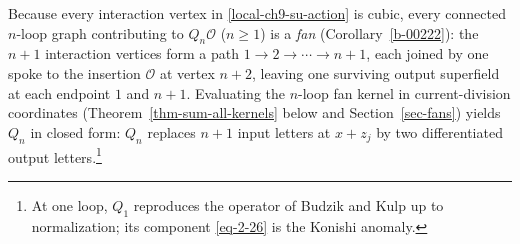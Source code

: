\documentclass[11pt]{article}
\numberwithin{equation}{section}
\numberwithin{figure}{section}
\numberwithin{table}{section}
\begin{document}
Because every interaction vertex in \eqref{local-ch9-su-action} is cubic, every connected $n$-loop graph contributing to $Q_n\mathcal O$ ($n\ge 1$) is a \emph{fan} (Corollary~\ref{b-00222}): the $n+1$ interaction vertices form a path $1\to 2\to\cdots\to n+1$, each joined by one spoke to the insertion $\mathcal O$ at vertex $n+2$, leaving one surviving output superfield at each endpoint $1$ and $n+1$. Evaluating the $n$-loop fan kernel in current-division coordinates (Theorem~\ref{thm-sum-all-kernels} below and Section~\ref{sec-fans}) yields $Q_n$ in closed form: $Q_n$ replaces $n+1$ input letters at $x+z_j$ by two differentiated output letters.\footnote{At one loop, $Q_1$ reproduces the operator of Budzik and Kulp \cite[Equations (3.64)--(3.70)]{BK} up to normalization; its component \eqref{eq-2-26} is the Konishi anomaly.}
\end{document}

